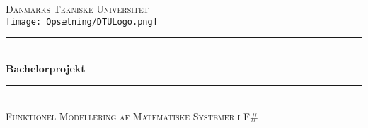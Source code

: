 \begin{titlepage} %
	\newcommand{\HRule}{\rule{\linewidth}{0.5mm}} %
	
	\center %
	   
	
	
	\textsc{\LARGE Danmarks Tekniske Universitet}\\[1.5cm] %
	
    \texttt{[image: Opsætning/DTULogo.png]}\\
	
	
	
	\HRule\\[0.5cm]
	
	{\huge\bfseries Bachelorprojekt}\\[0.4cm] %

	\HRule\\[0.5cm]
	
	\textsc{\Large Funktionel Modellering af Matematiske Systemer i F\#}\\[1cm] %
	
    \vfill\vfill\vfill
    \begin{minipage}{\textwidth}
		\begin{flushleft}
            \centering


\end{flushleft}
\end{minipage}
\end{titlepage}
